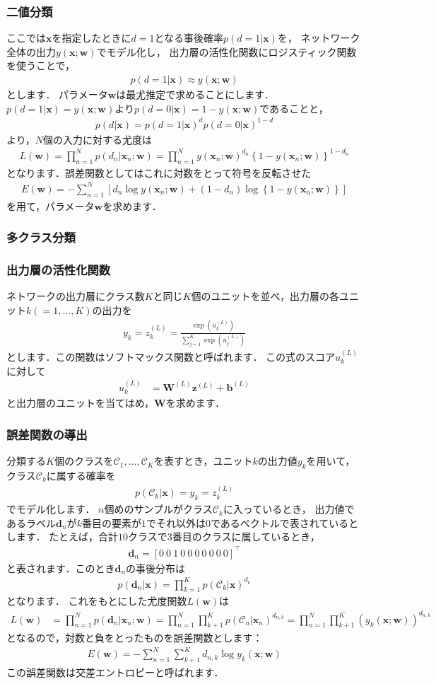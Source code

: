 \documentclass[a4paper,10pt]{jsarticle}
\theoremstyle{definition}
\newcommand{\eq}[1]{\begin{align}#1\end{align}}
\begin{document}
\subsubsection{二値分類}
ここでは$\mathbf{x}$を指定したときに$d=1$となる事後確率$p(d=1|\mathbf{x})$を，
ネットワーク全体の出力$y(\mathbf{x};\mathbf{w})$でモデル化し，
出力層の活性化関数にロジスティック関数を使うことで，
\eq{p(d=1|\mathbf{x})\approx y(\mathbf{x};\mathbf{w})}
とします．
パラメータ$\mathbf{w}$は最尤推定で求めることにします．
$p(d=1|\mathbf{x})=y(\mathbf{x};\mathbf{w})$より$p(d=0|\mathbf{x})=1-y(\mathbf{x};\mathbf{w})$であることと，
\eq{p(d|\mathbf{x})=p(d=1|\mathbf{x})^dp(d=0|\mathbf{x})^{1-d}}
より，$N$個の入力に対する尤度は
\eq{L(\mathbf{w})=\prod_{n=1}^Np(d_n|\mathbf{x}_n;\mathbf{w})=\prod_{n=1}^Ny(\mathbf{x}_n;\mathbf{w})^{d_n}\left\{1-y(\mathbf{x}_n;\mathbf{w})\right\}^{1-d_n}}
となります．誤差関数としてはこれに対数をとって符号を反転させた
\eq{E(\mathbf{w})=-\sum_{n=1}^N\left[d_n\log y(\mathbf{x}_n;\mathbf{w})+(1-d_n)\log\left\{1-y(\mathbf{x}_n;\mathbf{w})\right\}\right]}
を用て，パラメータ$\mathbf{w}$を求めます．
%
\subsubsection{多クラス分類}
\subsubsection*{出力層の活性化関数}
ネトワークの出力層にクラス数$K$と同じ$K$個のユニットを並べ，出力層の各ユニット$k(=1,...,K)$の出力を
\eq{y_k=z_k^{(L)}=\frac{\exp(u_k^{(L)})}{\sum_{j=1}^K\exp(u_j^{(L)})}}
とします．この関数はソフトマックス関数と呼ばれます．
この式のスコア$u_k^{(L)}$に対して
\eq{u_k^{(L)}&=\mathbf{W}^{(L)}\mathbf{z}^{(L)}+\mathbf{b}^{(L)}}
と出力層のユニットを当てはめ，$\mathbf{W}$を求めます．

\subsubsection*{誤差関数の導出}
分類する$K$個のクラスを$\mathcal{C}_1,...,\mathcal{C}_K$を表すとき，ユニット$k$の出力値$y_k$を用いて，クラス$\mathcal{C}_k$に属する確率を
\eq{p(\mathcal{C}_k|\mathbf{x})=y_k=z_k^{(L)}}
でモデル化します．
$n$個めのサンプルがクラス$\mathcal{C}_k$に入っているとき，
出力値であるラベル$\mathbf{d}_n$が$k$番目の要素が$1$でそれ以外は$0$であるベクトルで表されているとします．
たとえば，合計$10$クラスで$3$番目のクラスに属しているとき，
\eq{\mathbf{d}_n=[0~0~1~0~0~0~0~0~0~0]^\top}
と表されます．このとき$\mathbf{d}_n$の事後分布は
\eq{p(\mathbf{d}_n|\mathbf{x})=\prod_{k=1}^Kp(\mathcal{C}_k|\mathbf{x})^{d_k}}
となります．
これをもとにした尤度関数$L(\mathbf{w})$は
\eq{L(\mathbf{w})
	&=\prod_{n=1}^Np(\mathbf{d}_n|\mathbf{x}_n;\mathbf{w})
	=\prod_{n=1}^N\prod_{k+1}^Kp(\mathcal{C}_n|\mathbf{x}_n)^{d_{n,k}}
	=\prod_{n=1}^N\prod_{k+1}^K(y_k(\mathbf{x};\mathbf{w}))^{d_{n,k}}}
となるので，対数と負をとったものを誤差関数とします：
\eq{E(\mathbf{w})=-\sum_{n=1}^N\sum_{k+1}^Kd_{n,k}\log y_k(\mathbf{x};\mathbf{w})}
この誤差関数は交差エントロピーと呼ばれます．
\end{document}
